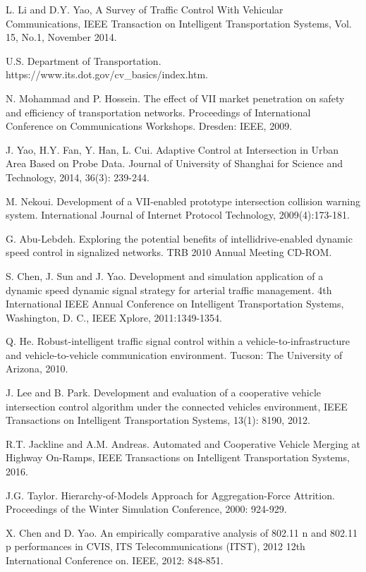 \documentclass[10.5pt,compsoc]{TsT}
\theoremstyle{mystyle}
\begin{document}
{\begin{thebibliography}{99}
 L. Li and D.Y. Yao, A Survey of Traffic Control With Vehicular
Communications, IEEE Transaction on Intelligent Transportation
Systems, Vol. 15, No.1, November 2014.

U.S. Department of Transportation.
https://www.its.dot.gov/cv\_basics/index.htm. 

N. Mohammad and P. Hossein. The effect of VII market penetration on
safety and efficiency of transportation networks. Proceedings of
International Conference on Communications Workshops. Dresden: IEEE,
2009. 

J. Yao, H.Y. Fan, Y. Han, L. Cui. Adaptive Control at Intersection in
Urban Area Based on Probe Data. Journal of University of Shanghai for
Science and Technology, 2014, 36(3): 239-244.

M. Nekoui. Development of a VII-enabled prototype intersection
collision warning system. International Journal of Internet Protocol
Technology, 2009(4):173-181.

G. Abu-Lebdeh. Exploring the potential benefits of
intellidrive-enabled dynamic speed control in signalized networks. TRB
2010 Annual Meeting CD-ROM.

S. Chen, J. Sun and J. Yao. Development and simulation application of
a dynamic speed dynamic signal strategy for arterial traffic
management. 4th International IEEE Annual Conference on Intelligent
Transportation Systems, Washington, D. C., IEEE Xplore,
2011:1349-1354.

Q. He. Robust-intelligent traffic signal control within a
vehicle-to-infrastructure and vehicle-to-vehicle communication
environment. Tucson: The University of Arizona, 2010. 

J. Lee and B. Park. Development and evaluation of a cooperative
vehicle intersection control algorithm under the connected vehicles
environment, IEEE Transactions on Intelligent Transportation Systems,
13(1): 8190, 2012.

R.T. Jackline and A.M. Andreas. Automated and Cooperative Vehicle
Merging at Highway On-Ramps, IEEE Transactions on Intelligent
Transportation Systems, 2016.

J.G. Taylor. Hierarchy-of-Models Approach for Aggregation-Force
Attrition. Proceedings of the Winter Simulation Conference, 2000:
924-929.

X. Chen and D. Yao. An empirically comparative analysis of 802.11 n
and 802.11 p performances in CVIS, ITS Telecommunications (ITST), 2012
12th International Conference on. IEEE, 2012: 848-851.


\end{thebibliography}}
\end{document}
